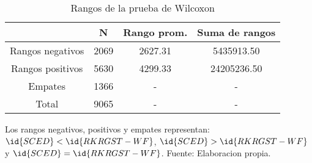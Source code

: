 \begin{table}[H]
\centering
\begin{tabular}{c|c|c|c|}
\cline{2-4}
                                       & N    & Rango prom. & Suma de rangos \\ \hline
\multicolumn{1}{|c|}{Rangos negativos} & 2069 & 2627.31     & 5435913.50     \\ \hline
\multicolumn{1}{|c|}{Rangos positivos} & 5630 & 4299.33     & 24205236.50    \\ \hline
\multicolumn{1}{|c|}{Empates}          & 1366 & -           & -              \\ \hline
\multicolumn{1}{|c|}{Total}            & 9065 & -           & -              \\ \hline
\end{tabular}
\caption{Rangos de la prueba de Wilcoxon}
Los rangos negativos, positivos y empates representan: $\id{SCED}<\id{RKRGST-WF}$, $\id{SCED}>\id{RKRGST-WF}$ y $\id{SCED}=\id{RKRGST-WF}$.
Fuente: Elaboracion propia.
\label{rangTable}
\end{table}
